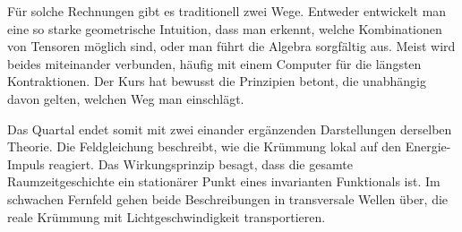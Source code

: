 Für solche Rechnungen gibt es traditionell zwei Wege. Entweder entwickelt man eine so starke geometrische Intuition, dass man erkennt, welche Kombinationen von Tensoren möglich sind, oder man führt die Algebra sorgfältig aus. Meist wird beides miteinander verbunden, häufig mit einem Computer für die längsten Kontraktionen. Der Kurs hat bewusst die Prinzipien betont, die unabhängig davon gelten, welchen Weg man einschlägt.

\begin{classroomqa}
\end{classroomqa}

Das Quartal endet somit mit zwei einander ergänzenden Darstellungen derselben Theorie. Die Feldgleichung beschreibt, wie die Krümmung lokal auf den Energie-Impuls reagiert. Das Wirkungsprinzip besagt, dass die gesamte Raumzeitgeschichte ein stationärer Punkt eines invarianten Funktionals ist. Im schwachen Fernfeld gehen beide Beschreibungen in transversale Wellen über, die reale Krümmung mit Lichtgeschwindigkeit transportieren.